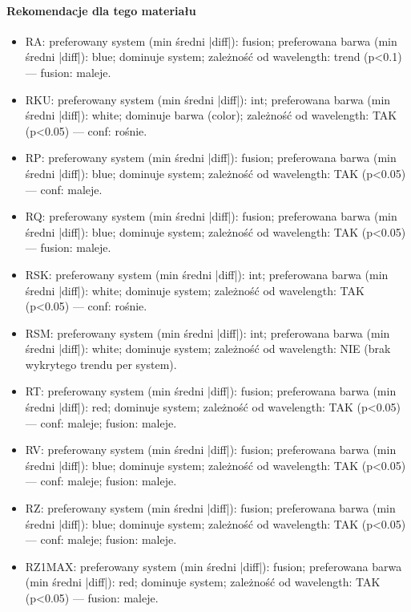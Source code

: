 \documentclass[
  10pt,
]{article}
\begin{document}
\paragraph{Rekomendacje dla tego materiału}
\begin{itemize}
\item RA: preferowany system (min średni |diff|): fusion; preferowana barwa (min średni |diff|): blue; dominuje system; zależność od wavelength: trend (p<0.1) — fusion: maleje.
\item RKU: preferowany system (min średni |diff|): int; preferowana barwa (min średni |diff|): white; dominuje barwa (color); zależność od wavelength: TAK (p<0.05) — conf: rośnie.
\item RP: preferowany system (min średni |diff|): fusion; preferowana barwa (min średni |diff|): blue; dominuje system; zależność od wavelength: TAK (p<0.05) — conf: maleje.
\item RQ: preferowany system (min średni |diff|): fusion; preferowana barwa (min średni |diff|): blue; dominuje system; zależność od wavelength: TAK (p<0.05) — fusion: maleje.
\item RSK: preferowany system (min średni |diff|): int; preferowana barwa (min średni |diff|): white; dominuje system; zależność od wavelength: TAK (p<0.05) — conf: rośnie.
\item RSM: preferowany system (min średni |diff|): int; preferowana barwa (min średni |diff|): white; dominuje system; zależność od wavelength: NIE (brak wykrytego trendu per system).
\item RT: preferowany system (min średni |diff|): fusion; preferowana barwa (min średni |diff|): red; dominuje system; zależność od wavelength: TAK (p<0.05) — conf: maleje; fusion: maleje.
\item RV: preferowany system (min średni |diff|): fusion; preferowana barwa (min średni |diff|): blue; dominuje system; zależność od wavelength: TAK (p<0.05) — conf: maleje; fusion: maleje.
\item RZ: preferowany system (min średni |diff|): fusion; preferowana barwa (min średni |diff|): blue; dominuje system; zależność od wavelength: TAK (p<0.05) — conf: maleje; fusion: maleje.
\item RZ1MAX: preferowany system (min średni |diff|): fusion; preferowana barwa (min średni |diff|): red; dominuje system; zależność od wavelength: TAK (p<0.05) — fusion: maleje.
\end{itemize}
\end{document}

